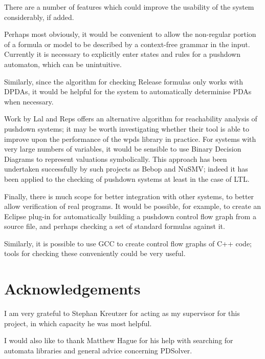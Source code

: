 \documentclass[11pt]{article}
\theoremstyle{definition}
\begin{document}
There are a number of features which could improve the usability of the system
considerably, if added.

Perhaps most obviously, it would be convenient to allow the non-regular portion
of a formula or model to be described by a context-free grammar in the input.
Currently it is necessary to explicitly enter states and rules for a pushdown
automaton, which can be unintuitive. 

Similarly, since the algorithm for checking Release formulas only works with
DPDAs, it would be helpful for the system to automatically determinise PDAs
when necessary.



Work by Lal and Reps\cite{lal2006improving} offers an alternative algorithm for
reachability analysis of pushdown systems; it may be worth investigating
whether their tool is able to improve upon the performance of the wpds library
in practice.
For systems with very large numbers of variables, it would be sensible to use
Binary Decision Diagrams to represent valuations symbolically. 
This approach has been undertaken successfully by such projects as
Bebop\cite{ball2000bebop} and NuSMV\cite{cimatti2002nusmv}; indeed it has been
applied to the checking of pushdown systems at least in the case of
LTL\cite{esparza2001bdd}.


Finally, there is much scope for better integration with other systems, to
better allow verification of real programs. It would be possible, for example,
to create an Eclipse plug-in for automatically building a pushdown control flow
graph from a source file, and perhaps checking a set of standard formulas
against it.

Similarly, it is possible to use GCC to create control flow graphs of C++ code;
tools for checking these conveniently could be very useful.

\section{Acknowledgements}

I am very grateful to Stephan Kreutzer for acting as my supervisor for this
project, in which capacity he was most helpful.

I would also like to thank Matthew Hague for his help with searching for
automata libraries and general advice concerning PDSolver.
\end{document}
